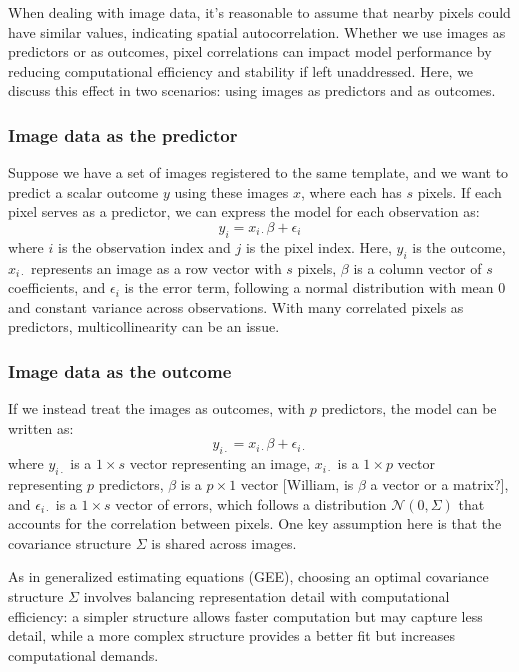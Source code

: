 \documentclass[12pt]{article}
\begin{document}
When dealing with image data, it's reasonable to assume that nearby pixels could have similar values, indicating spatial autocorrelation. Whether we use images as predictors or as outcomes, pixel correlations can impact model performance by reducing computational efficiency and stability if left unaddressed. Here, we discuss this effect in two scenarios: using images as predictors and as outcomes.

\subsubsection*{Image data as the predictor}

Suppose we have a set of images registered to the same template, and we want to predict a scalar outcome \( y \) using these images \( x \), where each has \( s \) pixels. If each pixel serves as a predictor, we can express the model for each observation as:
\[
  y_i = x_{i \cdot} \beta + \epsilon_i
\]
where \( i \) is the observation index and \( j \) is the pixel index. Here, \( y_i \) is the outcome, \( x_{i \cdot} \) represents an image as a row vector with \( s \) pixels, \( \beta \) is a column vector of \( s \) coefficients, and \( \epsilon_i \) is the error term, following a normal distribution with mean 0 and constant variance across observations. With many correlated pixels as predictors, multicollinearity can be an issue.

\subsubsection*{Image data as the outcome}

If we instead treat the images as outcomes, with \( p \) predictors, the model can be written as:
\[
  y_{i \cdot} = x_{i \cdot} \beta + \epsilon_{i \cdot}
\]
where \( y_{i \cdot} \) is a \( 1 \times s \) vector representing an image, \( x_{i \cdot} \) is a \( 1 \times p \) vector representing \( p \) predictors, \( \beta \) is a \( p \times 1 \) vector [William, is \( \beta \) a vector or a matrix?], and \( \epsilon_{i \cdot} \) is a \( 1 \times s \) vector of errors, which follows a distribution \( \mathcal{N}(0, \Sigma) \) that accounts for the correlation between pixels. One key assumption here is that the covariance structure \( \Sigma \) is shared across images.

As in generalized estimating equations (GEE), choosing an optimal covariance structure \( \Sigma \) involves balancing representation detail with computational efficiency: a simpler structure allows faster computation but may capture less detail, while a more complex structure provides a better fit but increases computational demands.
\end{document}
